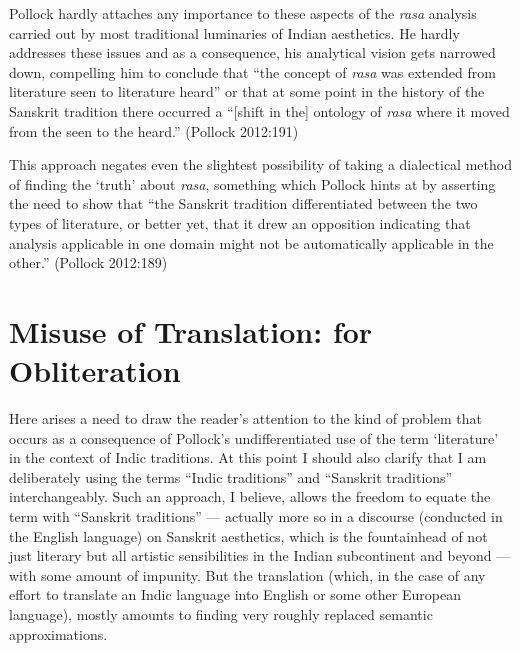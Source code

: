 Pollock hardly attaches any importance to these aspects of the \textsl{rasa} analysis carried out by most traditional luminaries of Indian aesthetics. He hardly addresses these issues and as a consequence, his analytical vision gets narrowed down, compelling him to conclude that “the concept of \textsl{rasa} was extended from literature seen to literature heard” or that at some point in the history of the Sanskrit tradition there occurred a “[shift in the] ontology of \textsl{rasa} where it moved from the seen to the heard.” (Pollock 2012:191) 

This approach negates even the slightest possibility of taking a dialectical method of finding the ‘truth’ about \textsl{rasa}, something which Pollock hints at by asserting the need to show that “the Sanskrit tradition differentiated between the two types of literature, or better yet, that it drew an opposition indicating that analysis applicable in one domain might not be automatically applicable in the other.” (Pollock 2012:189)\\[-22pt]

\section*{Misuse of Translation: for Obliteration}

Here arises a need to draw the reader’s attention to the kind of problem that occurs as a consequence of Pollock’s undifferentiated use of the term ‘literature’ in the context of Indic traditions. At this point I should also clarify that I am deliberately using the terms “Indic traditions” and “Sanskrit traditions” interchangeably. Such an approach, I believe, allows the freedom to equate the term with “Sanskrit traditions” --- actually more so in a discourse (conducted in the English language) on Sanskrit aesthetics, which is the fountainhead of not just literary but all artistic sensibilities in the Indian subcontinent and beyond --- with some amount of impunity. But the translation (which, in the case of any effort to translate an Indic language into English or some other European language), mostly amounts to finding very roughly replaced semantic approximations. 

